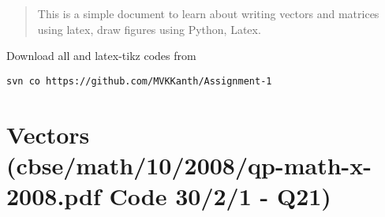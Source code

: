 \documentclass[journal,12pt,twocolumn]{IEEEtran}
\begin{document}
\newpage
\bigskip
\renewcommand{\thefigure}{\theenumi}
\renewcommand{\thetable}{\theenumi}
\begin{abstract}
This is a simple document to learn about writing vectors and matrices using latex, draw figures using Python, Latex.
\end{abstract}
%
Download all and latex-tikz codes from 
%
\begin{lstlisting}
svn co https://github.com/MVKKanth/Assignment-1
\end{lstlisting}
%
\section{Vectors\\(cbse/math/10/2008/qp-math-x-2008.pdf Code 30/2/1 - Q21)}
\renewcommand{\theequation}{\theenumi}
\end{document}
